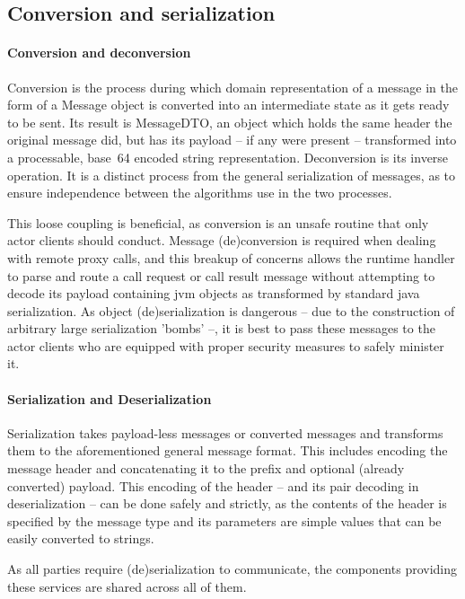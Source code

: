 \documentclass[11pt,a4paper,oneside]{report}
\begin{document}
		\subsection{Conversion and serialization}
		
			\paragraph{Conversion and deconversion}
		
			Conversion is the process during which domain representation of a message in the form of a Message object is converted into an intermediate state as it gets ready to be sent. Its result is MessageDTO, an object which holds the same header the original message did, but has its payload -- if any were present -- transformed into a processable, base~64 encoded string representation. Deconversion is its inverse operation. It is a distinct process from the general serialization of messages, as to ensure independence between the algorithms use in the two processes.
			
			This loose coupling is beneficial, as conversion is an unsafe routine that only actor clients should conduct. Message (de)conversion is required when dealing with remote proxy calls, and this breakup of concerns allows the runtime handler to parse and route a call request or call result message without attempting to decode its payload containing jvm objects as transformed by standard java serialization. As object (de)serialization is dangerous -- due to the construction of arbitrary large serialization 'bombs' --, it is best to pass these messages to the actor clients who are equipped with proper security measures to safely minister it.

			\paragraph{Serialization and Deserialization}
			
			Serialization takes payload-less messages or converted messages and transforms them to the aforementioned general message format. This includes encoding the message header and concatenating it to the prefix and optional (already converted) payload. This encoding of the header -- and its pair decoding in deserialization -- can be done safely and strictly, as the contents of the header is specified by the message type and its parameters are simple values that can be easily converted to strings.
			
			As all parties require (de)serialization to communicate, the components providing these services are shared across all of them.
\end{document}
